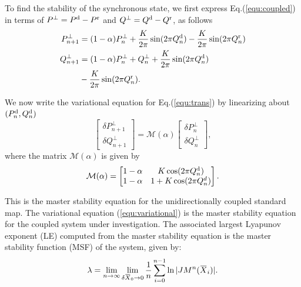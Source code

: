 \documentclass[reprint,amsmath,amssymb,aps,pre]{revtex4-1}
\newcommand{\overbar}[1]{\mkern 1.5mu\overline{\mkern-1.5mu#1\mkern-1.5mu}\mkern 1.5mu}
\begin{document}
To find the stability of the synchronous state, we first express  
Eq.(\ref{equ:coupled}) in terms of  $P^\perp = P^\textnormal{d} - 
P^\textnormal{r}$ and $Q^\perp = Q^\textnormal{d} -Q^\textnormal{r}$, as 
follows
\begin{eqnarray}
\label{equ:trans}
P^\perp_{n+1} &= (1-\alpha)P^\perp_n+ \frac{K}{2\pi} \sin(2\pi Q^\textnormal{d}_n) - 
\frac{K}{2\pi} \sin(2\pi Q^\textnormal{r}_n) \nonumber \\ 
Q^\perp_{n+1} &= (1-\alpha)P^\perp_n+ Q^\perp_n + \frac{K}{2\pi} \sin(2\pi 
Q^\textnormal{d}_n) \nonumber \\ &- \frac{K}{2\pi} \sin(2\pi Q^\textnormal{r}_n).
\end{eqnarray}

We now write the variational equation for Eq.(\ref{equ:trans}) by linearizing 
about $(P^\textnormal{d}_n,Q^\textnormal{d}_n)$
\begin{equation}
\label{equ:variational}
\left[ \begin{array}{c} \delta P^\perp_{n+1} \\ \delta Q^\perp_{n+1} 
\end{array} \right] = \mathcal{M}(\alpha)\left[ \begin{array}{c}\delta 
P^\perp_{n} \\ \delta Q^\perp_{n} \end{array} \right],
\end{equation}
where the matrix $\mathcal{M}(\alpha)$ is given by
\begin{equation} 
\label{equ:M}
\mathcal{M}(\alpha) = \begin{bmatrix} 1-\alpha & K\cos(2\pi Q^\textnormal{d}_n) \\ 1 - 
\alpha & 1 + K\cos(2\pi Q^d_n) \end{bmatrix}.
\end{equation}

This is the master stability equation for the unidirectionally coupled 
standard map. The variational equation (\ref{equ:variational}) is the master 
stability equation for the coupled system under investigation. The associated 
largest Lyapunov exponent (LE) computed from the master stability equation is the master stability function (MSF) of the system, given by:
\begin{equation}
\label{equ:msf}
\lambda  = \lim_{n \rightarrow \infty} \lim_{\delta\overbar{X}_0\rightarrow 
0}\frac{1}{n}\sum^{n-1}_{i=0}\ln|JM^n(\overbar{X}_i)|.
\end{equation}
\end{document}
